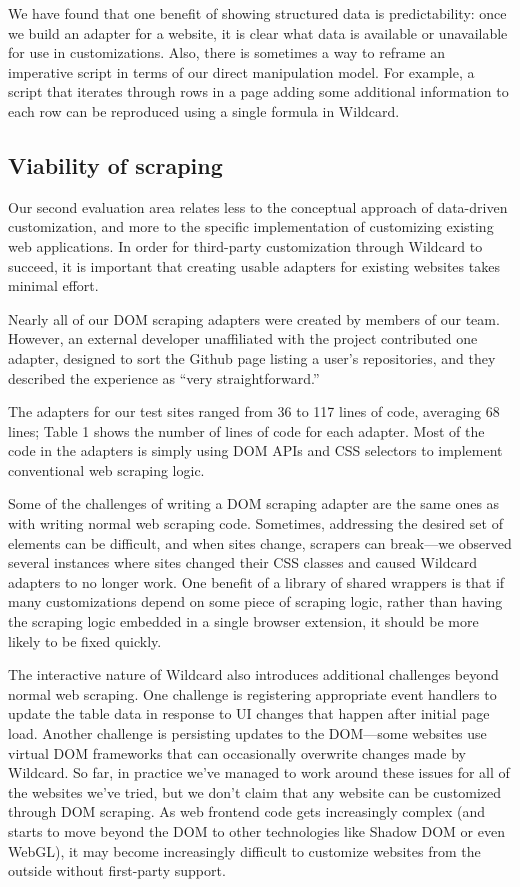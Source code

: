 \documentclass[sigplan,screen,10pt,anonymous,review]{acmart}
\begin{document}
We have found that one benefit of showing structured data is
predictability: once we build an adapter for a website, it is clear what
data is available or unavailable for use in customizations. Also, there
is sometimes a way to reframe an imperative script in terms of our
direct manipulation model. For example, a script that iterates through
rows in a page adding some additional information to each row can be
reproduced using a single formula in Wildcard.

\hypertarget{viability-of-scraping}{%
\subsection{Viability of scraping}\label{viability-of-scraping}}

Our second evaluation area relates less to the conceptual approach of
data-driven customization, and more to the specific implementation of
customizing existing web applications. In order for third-party
customization through Wildcard to succeed, it is important that creating
usable adapters for existing websites takes minimal effort.

Nearly all of our DOM scraping adapters were created by members of our
team. However, an external developer unaffiliated with the project
contributed one adapter, designed to sort the Github page listing a
user's repositories, and they described the experience as ``very
straightforward.''

The adapters for our test sites ranged from 36 to 117 lines of code,
averaging 68 lines; Table 1 shows the number of lines of code for each
adapter. Most of the code in the adapters is simply using DOM APIs and
CSS selectors to implement conventional web scraping logic.

Some of the challenges of writing a DOM scraping adapter are the same
ones as with writing normal web scraping code. Sometimes, addressing the
desired set of elements can be difficult, and when sites change,
scrapers can break---we observed several instances where sites changed
their CSS classes and caused Wildcard adapters to no longer work. One
benefit of a library of shared wrappers is that if many customizations
depend on some piece of scraping logic, rather than having the scraping
logic embedded in a single browser extension, it should be more likely
to be fixed quickly.

The interactive nature of Wildcard also introduces additional challenges
beyond normal web scraping. One challenge is registering appropriate
event handlers to update the table data in response to UI changes that
happen after initial page load. Another challenge is persisting updates
to the DOM---some websites use virtual DOM frameworks that can
occasionally overwrite changes made by Wildcard. So far, in practice
we've managed to work around these issues for all of the websites we've
tried, but we don't claim that any website can be customized through DOM
scraping. As web frontend code gets increasingly complex (and starts to
move beyond the DOM to other technologies like Shadow DOM or even
WebGL), it may become increasingly difficult to customize websites from
the outside without first-party support.
\end{document}
